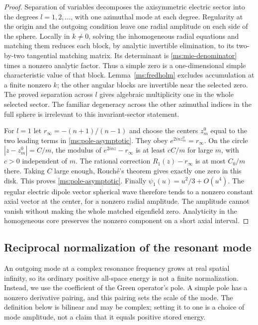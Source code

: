 \begin{proof}
Separation of variables decomposes the axisymmetric electric
sector into the degrees $l=1,2,\ldots$, with one azimuthal mode
at each degree.  Regularity at the origin and the outgoing condition
leave one radial amplitude on each side of the sphere.  Locally in
$k\ne0$, solving the inhomogeneous radial equations and matching
them reduces each block, by analytic invertible elimination, to
its two-by-two tangential matching matrix.  Its determinant is
\eqref{ms:mie-denominator} times a nonzero analytic factor.
Thus a simple zero is a one-dimensional simple characteristic
value of that block.  Lemma~\ref{ms:fredholm} excludes accumulation
at a finite nonzero $k$; the other angular blocks are invertible
near the selected zero.  The proved separation across $l$ gives
algebraic multiplicity one in the whole selected sector.
The familiar degeneracy across the other azimuthal indices in the
full sphere is irrelevant to this invariant-sector statement.

For $l=1$ let $r_\infty=-(n+1)/(n-1)$ and choose the centers
$z_m^0$ equal to the two leading terms in
\eqref{ms:pole-asymptotic}.  They obey $e^{2inz_m^0}=r_\infty$.
On the circle $|z-z_m^0|=C/m$, the modulus of
$e^{2inz}-r_\infty$ is at least $cC/m$ for large $m$, with
$c>0$ independent of $m$.  The rational correction
$R_1(z)-r_\infty$ is at most $C_0/m$ there.  Taking $C$ large
enough, Rouch\'e's theorem gives exactly one zero in this disk.
This proves \eqref{ms:pole-asymptotic}.  Finally
$\psi_1(u)=u^2/3+O(u^4)$.  The regular electric dipole vector
spherical wave therefore tends to a nonzero constant axial vector
at the center, for a nonzero radial amplitude.  The amplitude
cannot vanish without making the whole matched eigenfield zero.
Analyticity in the homogeneous core preserves the nonzero component
on a short axial interval.
\end{proof}

\subsection{Reciprocal normalization of the resonant mode}

An outgoing mode at a complex resonance frequency grows at real spatial
infinity, so its ordinary positive all-space energy is not a finite
normalization.  Instead, we use the coefficient of the Green operator's
pole.  A simple pole has a nonzero derivative pairing, and this pairing
sets the scale of the mode.  The definition below is bilinear and may be
complex; setting it to one is a choice of mode amplitude, not a claim
that it equals positive stored energy.

